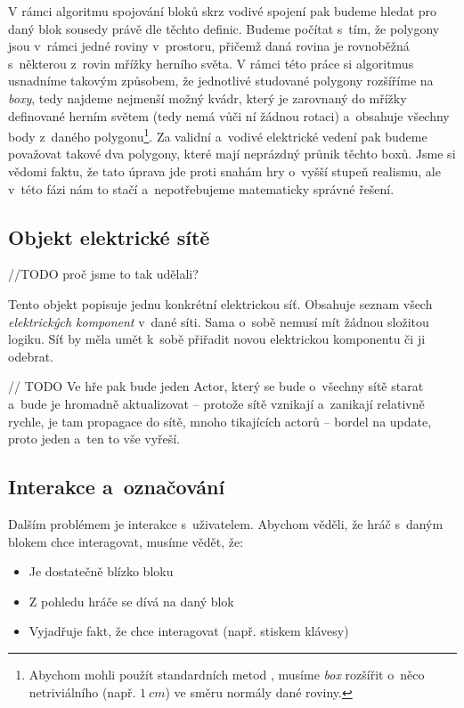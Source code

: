 V rámci algoritmu spojování bloků skrz vodivé spojení pak budeme hledat pro daný blok sousedy právě dle těchto definic. Budeme počítat s~tím, že polygony jsou v~rámci jedné roviny v~prostoru, přičemž daná rovina je rovnoběžná s~některou z~rovin mřížky herního světa. V rámci této práce si algoritmus usnadníme takovým způsobem, že jednotlivé studované polygony rozšíříme na \textit{boxy}, tedy najdeme nejmenší možný kvádr, který je zarovnaný do mřížky definované herním světem (tedy nemá vůči ní žádnou rotaci) a~obsahuje všechny body z~daného polygonu\footnote{Abychom mohli použít standardních metod , musíme \textit{box} rozšířit o~něco netriviálního (např. $1~cm$) ve směru normály dané roviny.}. Za validní a~vodivé elektrické vedení pak budeme považovat takové dva polygony, které mají neprázdný průnik těchto boxů. Jsme si vědomi faktu, že tato úprava jde proti snahám hry o~vyšší stupeň realismu, ale v~této fázi nám to stačí a~nepotřebujeme matematicky správné řešení.


\subsection{Objekt elektrické sítě}

//TODO proč jsme to tak udělali?

Tento objekt popisuje jednu konkrétní elektrickou síť. Obsahuje seznam všech \textit{elektrických komponent} v~dané síti. Sama o~sobě nemusí mít žádnou složitou logiku. Síť by měla umět k~sobě přiřadit novou elektrickou komponentu či ji odebrat. 


// TODO
Ve hře pak bude jeden Actor, který se bude o~všechny sítě starat a~bude je hromadně aktualizovat -- protože sítě vznikají a~zanikají relativně rychle, je tam propagace do sítě, mnoho tikajících actorů -- bordel na update, proto jeden a~ten to vše vyřeší.



\subsection{Interakce a~označování}
\label{subsec:interaction}

Dalším problémem je interakce s~uživatelem. Abychom věděli, že hráč s~daným blokem chce interagovat, musíme vědět, že:
\begin{itemize}
	\item Je dostatečně blízko bloku
	\item Z pohledu hráče se dívá na daný blok 
	\item Vyjadřuje fakt, že chce interagovat (např. stiskem klávesy)
\end{itemize}



